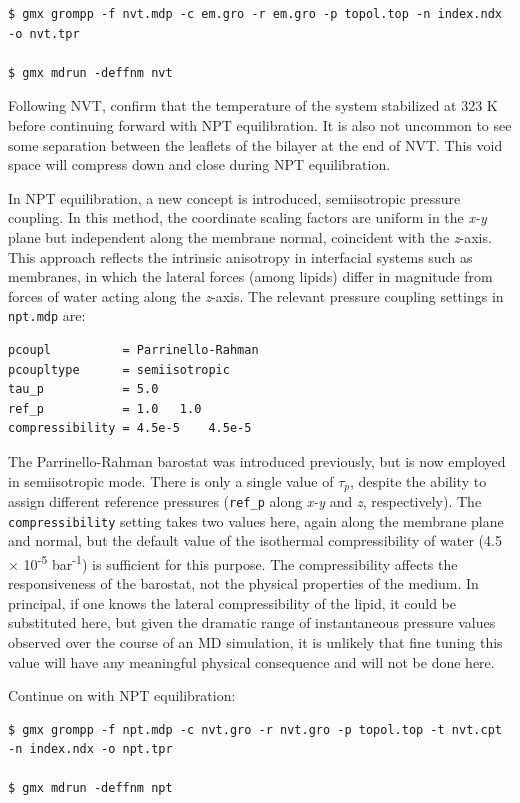 \documentclass[9pt,tutorial,pubversion]{livecoms}
\begin{document}
\begin{lstlisting}
$ gmx grompp -f nvt.mdp -c em.gro -r em.gro -p topol.top -n index.ndx -o nvt.tpr

$ gmx mdrun -deffnm nvt
\end{lstlisting}

Following NVT, confirm that the temperature of the system stabilized at 323 K before continuing forward with NPT equilibration. It is also not uncommon to see some separation between the leaflets of the bilayer at the end of NVT. This void space will compress down and close during NPT equilibration.

In NPT equilibration, a new concept is introduced, semiisotropic pressure coupling. In this method, the coordinate scaling factors are uniform in the {\em x-y} plane but independent along the membrane normal, coincident with the {\em z}-axis. This approach reflects the intrinsic anisotropy in interfacial systems such as membranes, in which the lateral forces (among lipids) differ in magnitude from forces of water acting along the {\em z}-axis. The relevant pressure coupling settings in \texttt{npt.mdp} are:

\begin{lstlisting}
pcoupl          = Parrinello-Rahman
pcoupltype      = semiisotropic
tau_p           = 5.0
ref_p           = 1.0   1.0
compressibility = 4.5e-5    4.5e-5
\end{lstlisting}
%
The Parrinello-Rahman barostat was introduced previously, but is now employed in semiisotropic mode. There is only a single value of $\tau_p$, despite the ability to assign different reference pressures (\texttt{ref\_p} along {\em x-y} and {\em z}, respectively). The \texttt{compressibility} setting takes two values here, again along the membrane plane and normal, but the default value of the isothermal compressibility of water (4.5 $\times$ 10\textsuperscript{-5} bar\textsuperscript{-1}) is sufficient for this purpose. The compressibility affects the responsiveness of the barostat, not the physical properties of the medium. In principal, if one knows the lateral compressibility of the lipid, it could be substituted here, but given the dramatic range of instantaneous pressure values observed over the course of an MD simulation, it is unlikely that fine tuning this value will have any meaningful physical consequence and will not be done here.

Continue on with NPT equilibration:

\begin{lstlisting}
$ gmx grompp -f npt.mdp -c nvt.gro -r nvt.gro -p topol.top -t nvt.cpt -n index.ndx -o npt.tpr

$ gmx mdrun -deffnm npt
\end{lstlisting}
\end{document}
